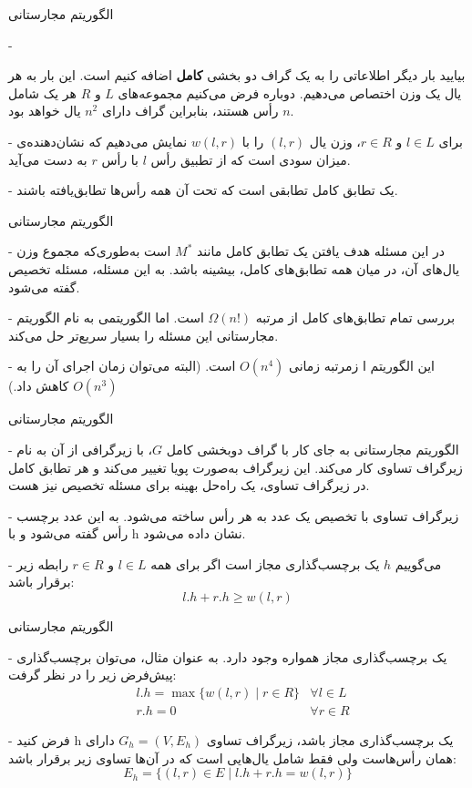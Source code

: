 \begin{itemframe}{الگوریتم مجارستانی}
\item[-]

بیایید بار دیگر اطلاعاتی را به یک گراف دو بخشی \textbf{کامل} اضافه کنیم است.
این بار به هر یال یک وزن اختصاص می‌دهیم.
دوباره فرض می‌کنیم مجموعه‌های $L$ و $R$ هر یک شامل $n$ رأس هستند، بنابراین گراف دارای
$n^2$
یال خواهد بود.
\item[-]
برای $l \in L$ و $r \in R$، وزن یال $(l, r)$ را با $w(l, r)$ نمایش می‌دهیم که نشان‌دهنده‌ی میزان سودی است که از تطبیق رأس $l$ با رأس $r$ به دست می‌آید.
\item[-]
یک تطابق کامل
 تطابقی است که تحت آن همه رأس‌ها تطابق‌یافته باشند.

\end{itemframe}


\begin{itemframe}{الگوریتم مجارستانی}
\item[-]
در این مسئله هدف یافتن یک تطابق کامل مانند
$M^*$
 است به‌طوری‌که مجموع وزن یال‌های آن، در میان همه تطابق‌های کامل، بیشینه باشد.
به این مسئله،‌ مسئله تخصیص
 گفته می‌شود.
\item[-]
بررسی تمام تطابق‌های کامل از مرتبه
$ \Omega (n!)$
است. اما الگوریتمی به نام الگوریتم مجارستانی
 این مسئله را بسیار سریع‌تر حل می‌کند.
\item[-]
این الگوریتم ا زمرتبه زمانی
$O(n^4)$
 است.
(البته می‌توان زمان اجرای آن را به
$O(n^3)$
 کاهش داد.)
\end{itemframe}


\begin{itemframe}{الگوریتم مجارستانی}
\item[-]
الگوریتم مجارستانی به جای کار با گراف دوبخشی کامل $G$، با زیرگرافی از آن به نام زیرگراف تساوی
کار می‌کند.
این زیرگراف به‌صورت پویا تغییر می‌کند و هر تطابق کامل در زیرگراف تساوی، یک راه‌حل بهینه برای مسئله تخصیص نیز هست.
\item[-]
زیرگراف تساوی با تخصیص یک عدد به هر رأس ساخته می‌شود. به این عدد برچسب رأس گفته می‌شود و با h نشان داده می‌شود.
\item[-]
می‌گوییم $h$ یک برچسب‌گذاری مجاز
است اگر برای همه $l \in L$ و $r \in R$ رابطه زیر برقرار باشد:
$$l.h + r.h \geq w(l, r)$$
\end{itemframe}


\begin{itemframe}{الگوریتم مجارستانی}
\item[-]
یک برچسب‌گذاری مجاز همواره وجود دارد. به عنوان مثال، می‌توان برچسب‌گذاری پیش‌فرض زیر را در نظر گرفت:
\begin{align*}
&l.h = \max \{ w(l, r) \mid r \in R \} &\forall l \in L\\
&r.h = 0 &\forall r \in R
\end{align*}
\item[-]
فرض کنید h یک برچسب‌گذاری مجاز باشد، زیرگراف تساوی $G_h = (V, E_h)$ دارای همان رأس‌هاست ولی فقط شامل یال‌هایی است که در آن‌ها تساوی زیر برقرار باشد:
$$
E_h = \{ (l, r) \in E \mid l.h + r.h = w(l, r) \}
$$
\end{itemframe}


